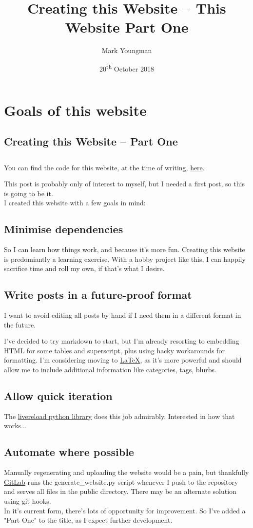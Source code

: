 \documentclass{article}
\title{Creating this Website -- This Website Part One}
\author{Mark Youngman}
\date{20\textsuperscript{th} October 2018\label{date}}
\makeatletter
\let\creationdate\@date
\makeatother
\begin{document}
\section{Goals of this website}
\subsection{Creating this Website -- Part One}
\subsection{\creationdate}

You can find the code for this website, at the time of writing, \href{https://gitlab.com/mmyoungman/homepage/tree/612851edba44990c5171bd651aed49073b4e3b5e}{here}.

This post is probably only of interest to myself, but I needed a first post, so this is going to be it.\\

I created this website with a few goals in mind:

\subsection{Minimise dependencies}
So I can learn how things work, and because it's more fun. Creating this website is predomiantly a learning exercise. With a hobby project like this, I can happily sacrifice time and roll my own, if that's what I desire.

\subsection{Write posts in a future-proof format}
I want to avoid editing all posts by hand if I need them in a different format in the future.

I've decided to try markdown to start, but I'm already resorting to embedding HTML for some tables and superscript, plus using hacky workarounds for formatting. I'm considering moving to \href{https://www.latex-project.org/}{LaTeX}, as it's more powerful and should allow me to include additional information like categories, tags, blurbs.

\subsection{Allow quick iteration}
The \href{https://github.com/lepture/python-livereload}{livereload python library} does this job admirably. Interested in how that works...

\subsection{Automate where possible}
Manually regenerating and uploading the website would be a pain, but thankfully \href{https://www.gitlab.com/}{GitLab} runs the generate\_website.py script whenever I push to the repository and serves all files in the public directory. There may be an alternate solution using git hooks.\\

In it's current form, there's lots of opportunity for improvement. So I've added a "Part One" to the title, as I expect further development.
\end{document}
